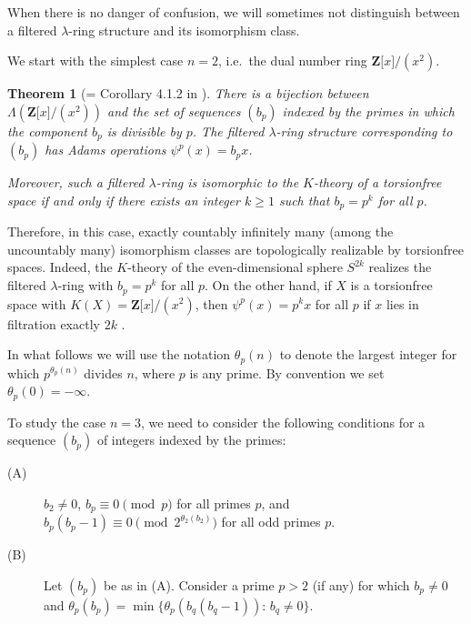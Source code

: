 \documentclass[reqno,11pt]{amsart}
\numberwithin{equation}{subsection}  %
\newtheorem{thm}[subsection]{Theorem}
\newcommand{\bZ}{\mathbf{Z}}
\begin{document}
When there is no danger of confusion, we will sometimes not distinguish between a filtered $\lambda$-ring structure and its isomorphism class. 



We start with the simplest case $n = 2$, i.e.\ the dual number ring $\bZ \lbrack x \rbrack/(x^2)$. 




\medskip
\begin{thm}[= Corollary 4.1.2 in \cite{yau1}]
\label{thm:n=2}
There is a bijection between $\Lambda(\bZ \lbrack x \rbrack/(x^2))$ and the set of sequences $(b_p)$ indexed by the primes in which the component $b_p$ is divisible by $p$.  The filtered $\lambda$-ring structure corresponding to $(b_p)$ has Adams operations $\psi^p(x) = b_p x$.

Moreover, such a filtered $\lambda$-ring is isomorphic to the $K$-theory of a torsionfree space if and only if there exists an integer $k \geq 1$ such that $b_p = p^k$ for all $p$.
\end{thm}


Therefore, in this case, exactly countably infinitely many (among the uncountably many) isomorphism classes are topologically realizable by torsionfree spaces.  Indeed, the $K$-theory of the even-dimensional sphere $S^{2k}$ realizes the filtered $\lambda$-ring with $b_p = p^k$ for all $p$.  On the other hand, if $X$ is a torsionfree space with $K(X) = \bZ \lbrack x \rbrack/(x^2)$, then $\psi^p(x) = p^kx$ for all $p$ if $x$ lies in filtration exactly $2k$ \cite[Corollary 5.2]{adams}.





In what follows we will use the notation $\theta_p(n)$ to denote the largest integer for which $p^{\theta_p(n)}$ divides $n$, where $p$ is any prime.  By convention we set $\theta_p(0) = -\infty$. 


To study the case $n = 3$, we need to consider the following conditions for a sequence $(b_p)$ of integers indexed by the primes:  
   \begin{description}
   \item[(A)] $b_2 \not= 0$, $b_p \equiv 0 \pmod{p}$ for all primes $p$, and $b_p(b_p - 1) \equiv 0 \pmod{2^{\theta_2(b_2)}}$ for all odd primes $p$.
   \item[(B)] Let $(b_p)$ be as in (A).  Consider a prime $p > 2$ (if any) for which $b_p \not= 0$ and $\theta_p(b_p) = \min\lbrace \theta_p(b_q(b_q - 1)) \colon \, b_q \not= 0 \rbrace$. 
   \end{description}
\end{document}
